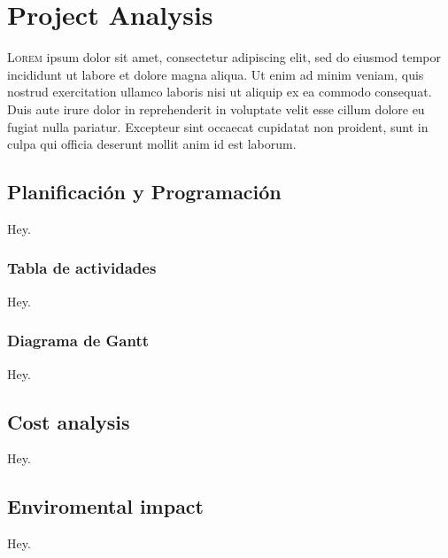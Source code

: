 

\chapter{Project Analysis} \label{cha:analysis}



\lettrine{L}{orem} ipsum dolor sit amet, consectetur
adipiscing elit, sed do eiusmod tempor incididunt ut labore et dolore magna
aliqua. Ut enim ad minim veniam, quis nostrud exercitation ullamco laboris nisi
ut aliquip ex ea commodo consequat. Duis aute irure dolor in reprehenderit in
voluptate velit esse cillum dolore eu fugiat nulla pariatur. Excepteur sint
occaecat cupidatat non proident, sunt in culpa qui officia deserunt mollit anim
id est laborum.


\section{Planificación y Programación}

Hey.

\subsection{Tabla de actividades}

Hey.

\subsection{Diagrama de Gantt}

Hey.


\section{Cost analysis}

Hey.


\section{Enviromental impact}

Hey.
